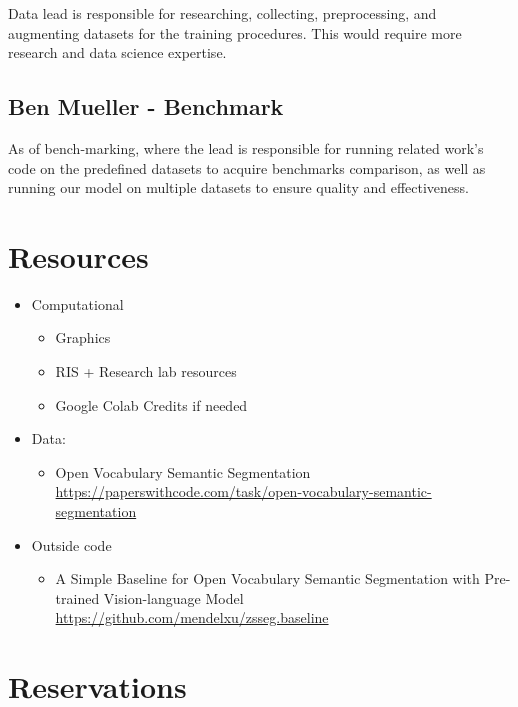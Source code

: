 \documentclass[10pt,twocolumn,letterpaper]{article}
\begin{document}
Data lead is responsible for researching, collecting, preprocessing, and augmenting datasets for the training procedures. This would require more research and data science expertise. 


\subsection{Ben Mueller - Benchmark}

As of bench-marking, where the lead is responsible for running related work’s code on the predefined datasets to acquire benchmarks comparison, as well as running our model on multiple datasets to ensure quality and effectiveness. 



\section{Resources}
\begin{itemize}
    \item Computational
    \begin{itemize}
        \item Graphics
        \item RIS + Research lab resources
        \item Google Colab Credits if needed
    \end{itemize}
    \item Data:
    \begin{itemize}
        \item Open Vocabulary Semantic Segmentation \\
        \url{https://paperswithcode.com/task/open-vocabulary-semantic-segmentation}
    \end{itemize}
    \item Outside code
    \begin{itemize}
        \item A Simple Baseline for Open Vocabulary Semantic Segmentation with Pre-trained Vision-language Model \\
        \url{https://github.com/mendelxu/zsseg.baseline}
    \end{itemize}
\end{itemize}

\section{Reservations}
\end{document}
